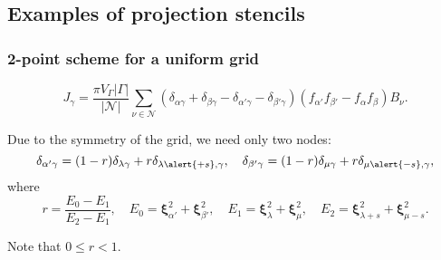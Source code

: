 \documentclass[mathserif]{beamer} %
\newcommand{\bxi}{\boldsymbol{\xi}}
\newcommand{\Nu}{\mathcal{N}}
\begin{document}
\subsection{Examples of projection stencils}

\begin{frame}
    \frametitle{2-point scheme for a uniform grid}
    \begin{equation}\label{eq:discrete_symm_ci_uniform}
        J_\gamma = \frac{\pi V_\Gamma|\Gamma|}{|\Nu|}
            \sum_{\nu\in\Nu} \left(
                \delta_{\alpha\gamma} + \delta_{\beta\gamma}
                - \delta_{\alpha'\gamma} - \delta_{\beta'\gamma}
            \right)\left( f_{\alpha'} f_{\beta'} - f_{\alpha} f_{\beta} \right)B_\nu.
    \end{equation}
    \vspace{-20pt}

    Due to the symmetry of the grid, we need only two nodes:
    \begin{equation}\label{eq:uniform_projection}
        \delta_{\alpha'\gamma} = (1-r)\delta_{\lambda\gamma} + r\delta_{\lambda\alert{+s},\gamma}, \quad
        \delta_{\beta'\gamma} = (1-r)\delta_{\mu\gamma} + r\delta_{\mu\alert{-s},\gamma},
    \end{equation}
    where
    \begin{equation}\label{eq:r_uniform}
        r = \frac{E_0-E_1}{E_2-E_1}, \quad
        E_0 = \bxi_{\alpha'}^2 + \bxi_{\beta'}^2, \quad
        E_1 = \bxi_{\lambda}^2 + \bxi_{\mu}^2, \quad
        E_2 = \bxi_{\lambda+s}^2 + \bxi_{\mu-s}^2.
    \end{equation}
    \vspace{-20pt}

    Note that \(0\leq r < 1\).
\end{frame}
\end{document}
